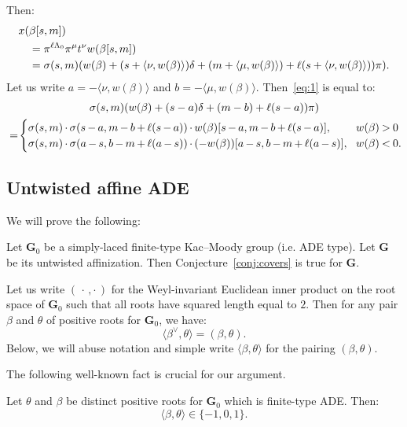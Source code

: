 \documentclass[ALCO,ThmDefs,Unicode]{cedram}
\newcommand{\bG}{\mathbf{G}}
\newcommand*{\mk}{\mkern -1mu}
\begin{document}
Then:
\begin{align}\label{eq:1}
x(&\beta[s,m])\\
&= \pi^{\ell \Lambda_0} \pi^{\mu} t^{\nu} w (\beta[s,m])\notag\\
&=\sigma(s,m) (w(\beta) + (s + \langle \nu, w(\beta) \rangle) \delta + (m + \langle \mu, w(\beta) \rangle) + \ell (s + \langle \nu, w(\beta) \rangle)) \pi).\notag
\end{align}
Let us write $a = -\langle \nu, w(\beta) \rangle$ and $b = -\langle \mu, w(\beta) \rangle$. Then~\eqref{eq:1} is equal to:
\begin{multline}\label{eq:3}
\sigma(s,m) (w(\beta) + (s - a) \delta + (m - b) + \ell (s - a)) \pi)\\
=\!
\begin{cases}
\sigma(s,m) \mk\cdot\mk \sigma(s\mk-\mk a,m\mk-\mk b\mk+\mk\ell(s\mk-\mk a)) \mk\cdot\mk w(\beta)[s\mk-\mk a, m\mk-\mk b \mk+\mk \ell(s\mk-\mk a)], & w(\beta) \mk>\mk 0 \\
\sigma(s,m) \mk\cdot\mk \sigma(a\mk-\mk s,b\mk-\mk m\mk+\mk\ell(a\mk-\mk s)) \mk\cdot\mk (-w(\beta))[a\mk-\mk s, b\mk-\mk m \mk+\mk \ell(a\mk-\mk s)],\! & w(\beta) \mk<\mk 0.
\end{cases}\!\!
\end{multline}

\subsection{Untwisted affine ADE}

We will prove the following:

\begin{theo}\label{thm:ade-covering}
Let $\bG_0$ be a simply-laced finite-type Kac--Moody group (i.e. ADE type). Let $\bG$ be its untwisted affinization. Then Conjecture~\ref{conj:covers} is true for $\bG$.
\end{theo}

Let us write $(\,\cdot\,,\cdot\,)$ for the Weyl-invariant Euclidean inner product on the root space of $\bG_0$ such that all roots have squared length equal to $2$. Then for any pair $\beta$ and $\theta$ of positive roots for $\bG_0$, we have:
\begin{equation}\label{eq:16}
\langle \beta^\vee, \theta \rangle = (\beta, \theta).
\end{equation}
Below, we will abuse notation and simple write $\langle \beta, \theta \rangle$ for the pairing $(\beta, \theta)$.

The following well-known fact is crucial for our argument.
\begin{lemm}\label{lem:pairings-in-finite-ade}
Let $\theta$ and $\beta$ be distinct positive roots for $\bG_0$ which is finite-type ADE. Then:
\begin{equation}\label{eq:9}
\langle \beta, \theta \rangle \in \{-1, 0, 1 \}.
\end{equation}
\end{lemm}
\end{document}
